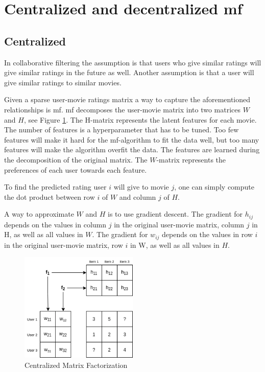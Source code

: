 \section{Centralized and decentralized \acrlong{mf}}

\subsection{Centralized}

In collaborative filtering the assumption is that users who give similar ratings will give similar ratings in the future as well. Another assumption is that a user will give similar ratings to similar movies.

Given a sparse user-movie ratings matrix a way to capture the aforementioned relationships is \acrfull{mf}. \acrshort{mf} decomposes the user-movie matrix into two matrices $W$ and $H$, see Figure \ref{fig:mf}. The H-matrix represents the latent features for each movie. The number of features is a hyperparameter that has to be tuned. Too few features will make it hard for the \acrshort{mf}-algorithm to fit the data well, but too many features will make the algorithm overfit the data. The features are learned during the decomposition of the original matrix. The $W$-matrix represents the preferences of each user towards each feature.

To find the predicted rating user $i$ will give to movie $j$, one can simply compute the dot product between row $i$  of $W$ and column $j$ of $H$.

A way to approximate $W$ and $H$ is to use gradient descent. The gradient for $h_{ij}$ depends on the values in column $j$ in the original user-movie matrix, column $j$ in H, as well as all values in $W$. The gradient for $w_{ij}$ depends on the values in row $i$ in the original user-movie matrix, row $i$ in W, as well as all values in $H$.

\begin{figure}
    \centering
    \includegraphics[width=0.5\textwidth]{figures/mf.png}
    \caption{Centralized Matrix Factorization}
    \label{fig:mf}
\end{figure}

